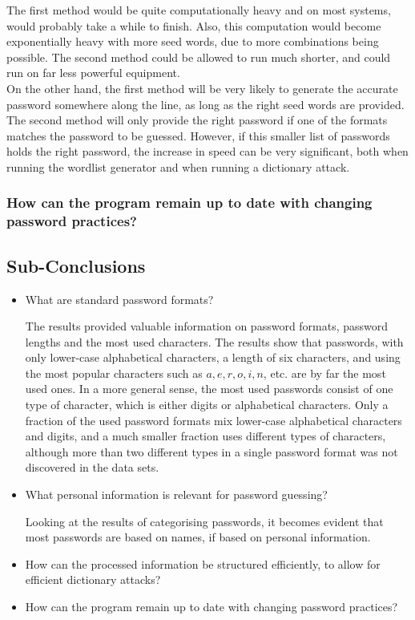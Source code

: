 \documentclass[a4paper,12pt]{article}
\begin{document}
The first method would be quite computationally heavy and on most systems, would probably take a while to finish. Also, this computation would become exponentially heavy with more seed words, due to more combinations being possible. The second method could be allowed to run much shorter, and could run on far less powerful equipment.\\
On the other hand, the first method will be very likely to generate the accurate password somewhere along the line, as long as the right seed words are provided. The second method will only provide the right password if one of the formats matches the password to be guessed. However, if this smaller list of passwords holds the right password, the increase in speed can be very significant, both when running the wordlist generator and when running a dictionary attack.

\subsubsection{How can the program remain up to date with changing password practices?}


\subsection{Sub-Conclusions}

\begin{itemize}
\item What are standard password formats?

  The results provided valuable information on password formats, password lengths and the most used characters. The results show that passwords, with only lower-case alphabetical characters, a length of six characters, and using the most popular characters such as $a,e,r,o,i,n$, etc. are by far the most used ones. In a more general sense, the most used passwords consist of one type of character, which is either digits or alphabetical characters. Only a fraction of the used password formats mix lower-case alphabetical characters and digits, and a much smaller fraction uses different types of characters, although more than two different types in a single password format was not discovered in the data sets.
  
\item What personal information is relevant for password guessing?

  Looking at the results of categorising passwords, it becomes evident that most passwords are based on names, if based on personal information.
  
\item How can the processed information be structured efficiently, to allow for efficient dictionary attacks?

\item How can the program remain up to date with changing password practices?

\end{itemize}
\end{document}
